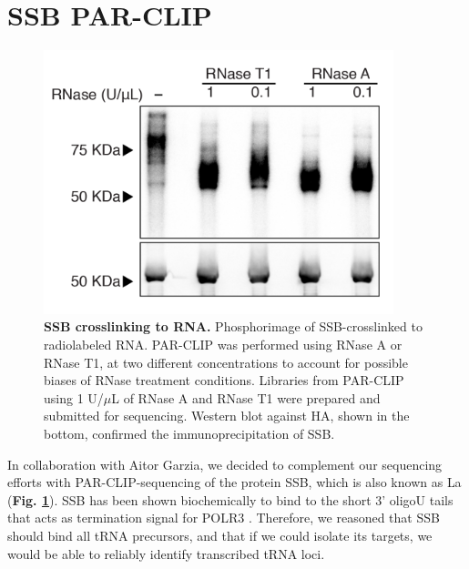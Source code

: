 \documentclass[12pt]{rockefeller}
\begin{document}
\section{SSB PAR-CLIP}

\begin{figure}[!ht]%
\centering
\includegraphics[width=4in]{paper2b.png}%
\caption[SSB crosslinking to RNA]
{\textbf{SSB crosslinking to RNA.}
Phosphorimage of SSB-crosslinked to radiolabeled RNA. PAR-CLIP was performed using RNase A or RNase T1, at two different concentrations to 
account for possible biases of RNase treatment conditions. Libraries from PAR-CLIP using 1 U/$\mu$L of RNase A and RNase T1 were prepared and submitted for sequencing. Western blot against HA, shown in the bottom, confirmed the immunoprecipitation of SSB.}
\centering
\label{paper2b}%
\end{figure}

In collaboration with Aitor Garzia, we decided to complement our sequencing efforts with PAR-CLIP-sequencing of the protein \gls{SSB}, which is also known as \gls{La} (\textbf{Fig. \ref{paper2b}}). SSB has been shown biochemically to bind to the short 3’ oligoU tails \cite{Stefano:1984wp} that acts as termination signal for POLR3 \cite{Maraia:2010kx}. Therefore, we reasoned that SSB should bind all tRNA precursors, and that if we could isolate its targets, we would be able to reliably identify transcribed tRNA loci. 
\end{document}
